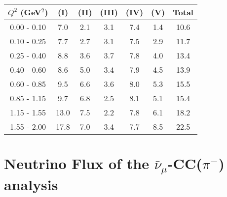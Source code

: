 \documentclass[aps, prd, reprint,showpacs,  preprintnumbers,amsmath,amssymb,superscriptaddress, nofootinbib]{revtex4-1}
\makeatletter
\newcommand{\anumu}{\ensuremath{\bar{\nu}_{\mu}}}
\renewenvironment{table}
  {\def\@captype{table}}
  {}
\makeatother
\begin{document}
\vspace{0.5cm}

\begin{table}
\centering
\begin{tabular}{ccccccc}
\hline
$Q^{2}$ (GeV$^{2}$) & (I) & (II) & (III) & (IV) & (V) & Total \\
\hline
 0.00 -  0.10  & 7.0  & 2.1  & 3.1  & 7.4  & 1.4  &10.6 \\
 0.10 -  0.25  & 7.7  & 2.7  & 3.1  & 7.5  & 2.9  &11.7 \\
 0.25 -  0.40  & 8.8  & 3.6  & 3.7  & 7.8  & 4.0  &13.4 \\
 0.40 -  0.60  & 8.6  & 5.0  & 3.4  & 7.9  & 4.5  &13.9 \\
 0.60 -  0.85  & 9.5  & 6.6  & 3.6  & 8.0  & 5.3  &15.5 \\
 0.85 -  1.15  & 9.7  & 6.8  & 2.5  & 8.1  & 5.1  &15.4 \\
 1.15 -  1.55  &13.0  & 7.5  & 2.2  & 7.8  & 6.1  &18.2 \\
 1.55 -  2.00  &17.8  & 7.0  & 3.4  & 7.7  & 8.5  &22.5 \\
\hline
 \hline
\end{tabular}
\caption{Fractional systematic uncertainties (in percent) for $d\sigma/dQ^2$.}
\label{tb:syst-Q2}
\end{table}

\vspace{0.4cm}

\newpage



\vspace{0.5cm}



\vspace{1cm}

\section{Neutrino Flux of the $\anumu$-CC($\pi^{-}$) analysis}
\end{document}
